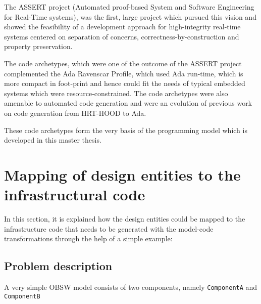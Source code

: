 The ASSERT project (Automated proof-based System and Software Engineering for Real-Time systems), was the first, large project which pursued this vision and showed the feasibility of a development approach for high-integrity real-time systems centered on separation of concerns, correctness-by-construction and property preservation.

The code archetypes, which were one of the outcome of the ASSERT project complemented the Ada Ravenscar Profile, which used Ada run-time, which is more compact in foot-print and hence could fit the needs of typical embedded systems which were resource-constrained. The code archetypes were also amenable to automated code generation and were an evolution of previous work on code generation from HRT-HOOD to Ada.

These code archetypes form the very basis of the programming model which is developed in this master thesis.

\section{Mapping of design entities to the infrastructural code}    
In this section, it is explained how the design entities could be mapped to the infrastructure code that needs to be generated with the model-code transformations through the help of a simple example:

\subsection{Problem description}
A very simple OBSW model consists of two components, namely \texttt{ComponentA} and \texttt{ComponentB} 

